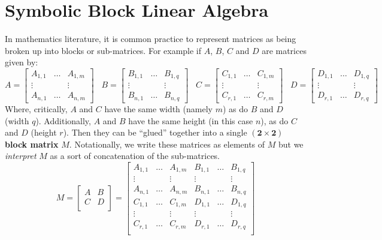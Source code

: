 \chapter{Symbolic Block Linear Algebra}
\label{chp:matrix}


In mathematics literature, it is common practice to represent matrices as being broken up into blocks or sub-matrices.
For example if $A$, $B$, $C$ and $D$ are matrices given by:
\begin{equation*}
	A = \begin{bmatrix} 
		A_{1,1} & \ldots & A_{1,m} \\
		\vdots & & \vdots \\
		A_{n,1} & \ldots & A_{n,m}
	\end{bmatrix}
	\;\;\;
	B = \begin{bmatrix} 
		B_{1,1} & \ldots & B_{1,q} \\
		\vdots & & \vdots \\
		B_{n,1} & \ldots & B_{n,q}
	\end{bmatrix}	
	\;\;\;
	C = \begin{bmatrix} 
		C_{1,1} & \ldots & C_{1,m} \\
		\vdots & & \vdots \\
		C_{r,1} & \ldots & C_{r,m}
	\end{bmatrix}
	\;\;\;
	D = \begin{bmatrix} 
		D_{1,1} & \ldots & D_{1,q} \\
		\vdots & & \vdots \\
		D_{r,1} & \ldots & D_{r,q}
	\end{bmatrix}			
\end{equation*}
Where, critically, $A$ and $C$ have the same width (namely $m$) as do $B$ and $D$ (width $q$).
Additionally, $A$ and $B$ have the same height (in this case $n$), as do $C$ and $D$ (height $r$).
Then they can be ``glued'' together into a single  $\boldsymbol{(2 \times 2)}$ \textbf{block matrix} $M$.
Notationally, we write these matrices as elements of $M$ but we \emph{interpret} $M$ as a sort of concatenation of the
sub-matrices.
\begin{equation}
	M= \left[
		\begin{array}{c|c}
			A & B \\
			\hline
			C & D \\
		\end{array}
	\right] = \left[
		\begin{array}{ccc|ccc}
			A_{1,1} & \ldots &A_{1,m} & B_{1,1} & \ldots & B_{1,q} \\
			\vdots & & \vdots & \vdots & & \vdots \\
			A_{n, 1} & \ldots & A_{n, m} & B_{n,1} & \ldots & B_{n,q} \\
			\hline
			C_{1, 1} & \ldots & C_{1, m} & D_{1,1} & \ldots & D_{1,q} \\
			\vdots & & \vdots & \vdots & & \vdots \\
			C_{r,1} & \ldots & C_{r,m} & D_{r,1} & \ldots & D_{r,q} \\
		\end{array}
	\right]
\end{equation}


